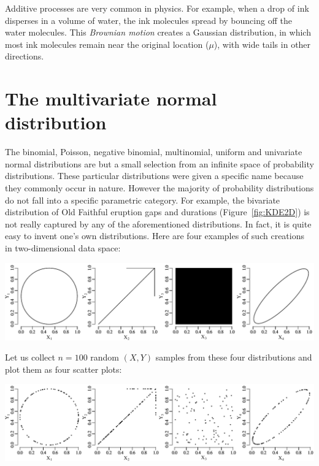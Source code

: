 Additive processes are very common in physics. For example, when a
drop of ink disperses in a volume of water, the ink molecules spread
by bouncing off the water molecules.  This \emph{Brownian motion}
creates a Gaussian distribution, in which most ink molecules remain
near the original location ($\mu$), with wide tails in other
directions.

\section{The multivariate normal distribution}
\label{sec:multinorm}

The binomial, Poisson, negative binomial, multinomial, uniform and
univariate normal distributions are but a small selection from an
infinite space of probability distributions. These particular
distributions were given a specific name because they commonly occur
in nature.  However the majority of probability distributions do not
fall into a specific parametric category.  For example, the bivariate
distribution of Old Faithful eruption gaps and durations
(Figure~\ref{fig:KDE2D}) is not really captured by any of the
aforementioned distributions. In fact, it is quite easy to invent
one's own distributions. Here are four examples of such creations in
two-dimensional data space:\medskip

\noindent\includegraphics[width=\textwidth]{../figures/pop2d.pdf}
\begingroup {}
\label{fig:pop2d}
\endgroup

Let us collect $n=100$ random $(X,Y)$ samples from these four
distributions and plot them as four scatter plots:\medskip

\noindent\includegraphics[width=\textwidth]{../figures/rand2d.pdf}
\begingroup {}
\label{fig:rand2d}
\endgroup

